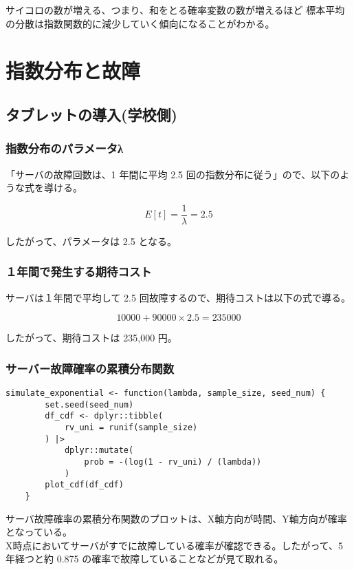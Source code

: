 \documentclass{article}
\begin{document}
サイコロの数が増える、つまり、和をとる確率変数の数が増えるほど
標本平均の分散は指数関数的に減少していく傾向になることがわかる。

\section{指数分布と故障}
\subsection{タブレットの導入(学校側)}
\subsubsection{指数分布のパラメータλ}

「サーバの故障回数は、1 年間に平均 2.5 回の指数分布に従う」ので、以下のような式を導ける。

\[ E[t] = \frac{1}{\lambda} = 2.5 \]

したがって、パラメータ\lambda は 2.5 となる。

\subsubsection{１年間で発生する期待コスト}

サーバは１年間で平均して 2.5 回故障するので、期待コストは以下の式で導る。

\[ 10000 + 90000 \times 2.5 = 235000 \]

したがって、期待コストは 235,000 円。

\subsubsection{サーバー故障確率の累積分布関数}

\begin{lstlisting}[]
	simulate_exponential <- function(lambda, sample_size, seed_num) {
		set.seed(seed_num)
		df_cdf <- dplyr::tibble(
			rv_uni = runif(sample_size)
		) |>
			dplyr::mutate(
				prob = -(log(1 - rv_uni) / (lambda))
			)
		plot_cdf(df_cdf)
	}

\end{lstlisting}

サーバ故障確率の累積分布関数のプロットは、X軸方向が時間、Y軸方向が確率となっている。\\
X時点においてサーバがすでに故障している確率が確認できる。したがって、5年経つと約 0.875 の確率で故障していることなどが見て取れる。
\end{document}
